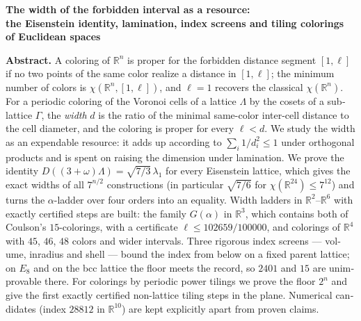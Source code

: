 \documentclass[11pt]{article}
\theoremstyle{definition}
\theoremstyle{remark}
\newcommand{\R}{\mathbb{R}}
\begin{document}
\begin{otherlanguage}{english}
\begin{center}
{\bfseries The width of the forbidden interval as a resource:\\
the Eisenstein identity, lamination, index screens and tiling colorings of
Euclidean spaces}
\end{center}

\noindent\textbf{Abstract.}
A coloring of $\R^n$ is proper for the forbidden distance segment $[1,\ell]$ if
no two points of the same color realize a distance in $[1,\ell]$; the minimum
number of colors is $\chi(\R^n,[1,\ell])$, and $\ell=1$ recovers the classical
$\chi(\R^n)$. For a periodic coloring of the Voronoi cells of a lattice
$\Lambda$ by the cosets of a sublattice $\Gamma$, the \emph{width} $d$ is the
ratio of the minimal same-color inter-cell distance to the cell diameter, and
the coloring is proper for every $\ell<d$. We study the width as an expendable
resource: it adds up according to $\sum_i1/d_i^2\le1$ under orthogonal
products and is spent on raising the dimension under lamination. We prove the
identity $D((3+\omega)\Lambda)=\sqrt{7/3}\,\lambda_1$ for every Eisenstein
lattice, which gives the exact widths of all $7^{n/2}$ constructions (in
particular $\sqrt{7/6}$ for $\chi(\R^{24})\le7^{12}$) and turns the
$\alpha$-ladder over four orders into an equality. Width ladders in
$\R^2$--$\R^6$ with exactly certified steps are built: the family $G(\alpha)$ in $\R^3$, which contains both
of Coulson's $15$-colorings, with a certificate $\ell\le102659/100000$, and
colorings of $\R^4$ with $45$, $46$, $48$ colors and wider intervals. Three
rigorous index screens --- volume, inradius and shell --- bound the index from
below on a fixed parent lattice; on $E_8$ and on the bcc lattice the floor meets
the record, so $2401$ and $15$ are unimprovable there. For colorings by periodic
power tilings we prove the floor $2^n$ and give the first exactly certified
non-lattice tiling steps in the plane. Numerical candidates (index $28812$ in
$\R^{10}$) are kept explicitly apart from proven claims.
\end{otherlanguage}








\end{document}
